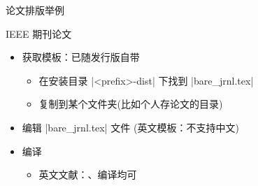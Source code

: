   \begin{frame}[fragile]{论文排版举例}
    \begin{exampleblock}{IEEE 期刊论文}
      \begin{itemize}
        \item 获取模板：已随发行版自带
          \begin{itemize}
            \item 在安装目录 |<prefix>\texlive{}\texmf-dist\doc\latex\IEEEtran|
              下找到 |bare_jrnl.tex|
            \item 复制到某个文件夹(比如个人存论文的目录)
          \end{itemize}
        \item 编辑 |bare_jrnl.tex| 文件 (英文模板：不支持中文)
        \item 编译
          \begin{itemize}
            \item 英文文献：\XeLaTeX 、\pdfLaTeX 编译均可
          \end{itemize}
      \end{itemize}
    \end{exampleblock}
  \end{frame}



